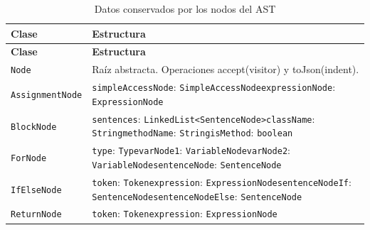 \begingroup
\small
\renewcommand{\arraystretch}{1.2}
\setlength{\tabcolsep}{5pt}
\setlength{\LTleft}{0pt}
\setlength{\LTright}{0pt}
\begin{longtable}{|>{\raggedright\arraybackslash}p{}|>{\raggedright\arraybackslash}p{}|}
\caption{Datos conservados por los nodos del AST}\label{tab:nodos-ast}\\
\hline
\textbf{Clase} & \textbf{Estructura} \\ \hline
\endfirsthead
\hline
\textbf{Clase} & \textbf{Estructura} \\ \hline
\endhead
\texttt{Node} & Raíz abstracta. Operaciones accept(visitor) y toJson(indent). \\ \hline
\texttt{Assignment\allowbreak Node} & \texttt{simple\allowbreak Access\allowbreak Node}: \texttt{Simple\allowbreak Access\allowbreak Node}\newline \texttt{expression\allowbreak Node}: \texttt{Expression\allowbreak Node} \\ \hline
\texttt{Block\allowbreak Node} & \texttt{sentences}: \texttt{Linked\allowbreak List<Sentence\allowbreak Node>}\newline \texttt{class\allowbreak Name}: \texttt{String}\newline \texttt{method\allowbreak Name}: \texttt{String}\newline \texttt{is\allowbreak Method}: \texttt{boolean} \\ \hline
\texttt{For\allowbreak Node} & \texttt{type}: \texttt{Type}\newline \texttt{var\allowbreak Node1}: \texttt{Variable\allowbreak Node}\newline \texttt{var\allowbreak Node2}: \texttt{Variable\allowbreak Node}\newline \texttt{sentence\allowbreak Node}: \texttt{Sentence\allowbreak Node} \\ \hline
\texttt{If\allowbreak Else\allowbreak Node} & \texttt{token}: \texttt{Token}\newline \texttt{expression}: \texttt{Expression\allowbreak Node}\newline \texttt{sentence\allowbreak Node\allowbreak If}: \texttt{Sentence\allowbreak Node}\newline \texttt{sentence\allowbreak Node\allowbreak Else}: \texttt{Sentence\allowbreak Node} \\ \hline
\texttt{Return\allowbreak Node} & \texttt{token}: \texttt{Token}\newline \texttt{expression}: \texttt{Expression\allowbreak Node} \\ \hline

\end{longtable}
